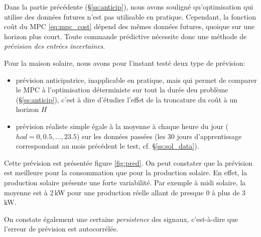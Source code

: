 \documentclass[a4paper,10pt,twocolumn]{article}
\begin{document}
Dans la partie précédente (§\ref{ss:anticip}), nous avons souligné
qu'optimisation qui utilise des données futures n'est pas utilisable
en pratique. Cependant, la fonction coût du MPC \eqref{eq:mpc_cost} dépend des
mêmes données futures, quoique sur une horizon plus court.
Toute commande prédictive nécessite donc une méthode de \emph{prévision des entrées incertaines}.

Pour la maison solaire, nous avons pour l'instant testé deux type de prévision:
\begin{itemize}
 \item prévision anticipatrice, inapplicable en pratique, mais qui permet
 de comparer le MPC à l'optimisation déterministe sur tout la durée deu problème
 (§\ref{ss:anticip}), c'est à dire d'étudier l'effet de la troncature du coût
 à un horizon $H$
 \item prévision réaliste simple égale à la moyenne à chaque heure du jour
 ($hod = 0, 0.5, ..., 23.5$) sur les données passées
 (les 30 jours d'apprentissage correspondant au mois précédent le test, cf. §\ref{ss:sol_data}).
\end{itemize}

Cette prévision est présentée figure \ref{fig:pred}.
On peut constater que la prévision est meilleure pour la consommation
que pour la production solaire. En effet, la production solaire présente
une forte variabilité. Par exemple à midi solaire, la moyenne est à 2\,kW
pour une production réelle allant de presque 0 à plus de 3\,kW.

On constate également une certaine \emph{persistence} des signaux,
c'est-à-dire que l'erreur de prévision est autocorrélée.
\end{document}
